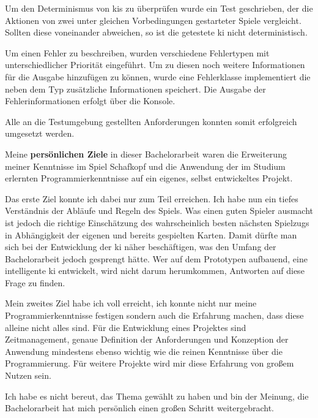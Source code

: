 \documentclass[
							a4paper, 
							11pt, 
							openany, 
							liststotoc,
							parskip=half, 
   							headings=normal
						]{scrreprt}
\begin{document}
{Um den Determinismus von \acs{ki}s zu überprüfen wurde ein Test geschrieben, der die Aktionen von zwei unter gleichen Vorbedingungen gestarteter Spiele vergleicht. Sollten diese voneinander abweichen, so ist die getestete \acs{ki} nicht deterministisch.

Um einen Fehler zu beschreiben, wurden verschiedene Fehlertypen mit unterschiedlicher Priorität eingeführt. Um zu diesen noch weitere Informationen für die Ausgabe hinzufügen zu können, wurde eine Fehlerklasse implementiert die neben dem Typ zusätzliche Informationen speichert.\newline
Die Ausgabe der Fehlerinformationen erfolgt über die Konsole.

Alle an die Testumgebung gestellten Anforderungen konnten somit erfolgreich umgesetzt werden.

Meine \textbf{persönlichen Ziele} in dieser Bachelorarbeit waren die Erweiterung meiner Kenntnisse im Spiel Schafkopf und die Anwendung der im Studium erlernten Programmierkenntnisse auf ein eigenes, selbst entwickeltes Projekt.

Das erste Ziel konnte ich dabei nur zum Teil erreichen. Ich habe nun ein tiefes Verständnis der Abläufe und Regeln des Spiels. Was einen guten Spieler ausmacht ist jedoch die richtige Einschätzung des wahrscheinlich besten nächsten Spielzugs in Abhängigkeit der eigenen und bereits gespielten Karten. Damit dürfte man sich bei der Entwicklung der \linebreak 
\acs{ki} näher beschäftigen, was den Umfang der Bachelorarbeit jedoch gesprengt hätte. Wer auf dem Prototypen aufbauend, eine intelligente \acs{ki} entwickelt, wird nicht darum herumkommen, Antworten auf diese Frage zu finden.

Mein zweites Ziel habe ich voll erreicht, ich konnte nicht nur meine Programmierkenntnisse festigen sondern auch die Erfahrung machen, dass diese alleine nicht alles sind. Für die Entwicklung eines Projektes sind Zeitmanagement, genaue Definition der Anforderungen und Konzeption der Anwendung mindestens ebenso wichtig wie die reinen Kenntnisse über die Programmierung. Für weitere Projekte wird mir diese Erfahrung von großem Nutzen sein. 

Ich habe es nicht bereut, das Thema gewählt zu haben und bin der Meinung, die Bachelorarbeit hat mich persönlich einen großen Schritt weitergebracht.


}
\end{document}
